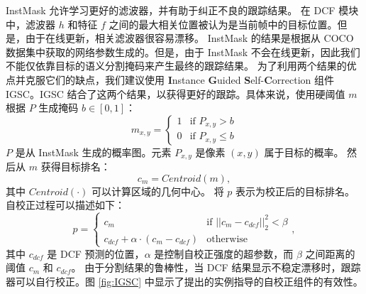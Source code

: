 InstMask 允许学习更好的滤波器，并有助于纠正不良的跟踪结果。
在 DCF 模块中，滤波器 $h$ 和特征 $f$ 之间的最大相关位置被认为是当前帧中的目标位置。但是，由于在线更新，相关滤波器很容易漂移。
InstMask 的结果是根据从 COCO 数据集中获取的网络参数生成的。但是，由于 InstMask 不会在线更新，因此我们不能仅依靠目标的语义分割掩码来产生最终的跟踪结果。
为了利用两个结果的优点并克服它们的缺点，我们建议使用 \textbf{I}nstance \textbf{G}uided \textbf{S}elf-\textbf{C}orrection 组件 IGSC。IGSC 结合了这两个结果，以获得更好的跟踪。具体来说，使用硬阈值 $m$ 根据 $P$ 生成掩码 $b \in [0, 1] $：
\begin{equation}
m_{x,y} = \left\{ \begin{array}{ll}
 1 & \textrm{if $P_{x,y} > b$}\\
 0 & \textrm{if $P_{x,y} \le b$}
 \end{array} \right.
\end{equation}
$P$ 是从 InstMask 生成的概率图。元素 $P_{x,y}$ 是像素 $(x,y)$ 属于目标的概率。
然后从 $m$ 获得目标排名：
\begin{equation}
c_{m} = Centroid(m),
\end{equation}
其中 $Centroid(\mathord{\cdot})$ 可以计算区域的几何中心。
将 $p$ 表示为校正后的目标排名。
自校正过程可以描述如下：
\begin{equation}
p = \left\{ \begin{array}{ll}
 c_{m} & \textrm{if $||c_{m}-c_{dcf}||_2^2 < \beta$}\\
 c_{dcf} + \alpha \cdot (c_{m}-c_{dcf}) & \textrm{otherwise}
 \end{array} \right.,
\end{equation}
其中 $c_{dcf}$ 是 DCF 预测的位置，$\alpha$ 是控制自校正强度的超参数，而 $\beta$ 之间距离的阈值 $c_{m}$ 和 $c_{dcf}$。
由于分割结果的鲁棒性，当 DCF 结果显示不稳定漂移时，跟踪器可以自行校正。图 \ref{fig:IGSC} 中显示了提出的实例指导的自校正组件的有效性。

